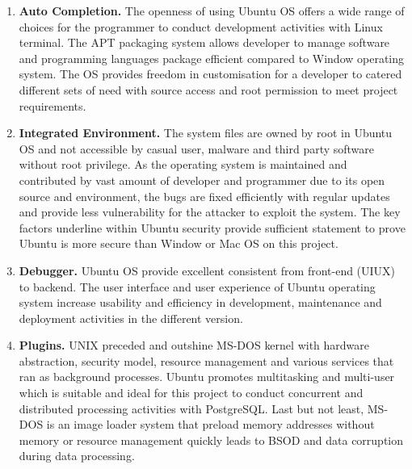 \begin{enumerate}[topsep=0pt,itemsep=-1ex,partopsep=1ex,parsep=1.5ex]
	
	\item \textbf{Auto Completion.} The openness of using Ubuntu OS offers a wide range of choices for the programmer to conduct development activities with Linux terminal. The APT packaging system allows developer to manage software and programming languages package efficient compared to Window operating system. The OS provides freedom in customisation for a developer to catered different sets of need with source access and root permission to meet project requirements.
	\newline
	
	\item \textbf{Integrated Environment. } The system files are owned by root in Ubuntu OS and not accessible by casual user, malware and third party software without root privilege. \cite{ubuntu-secure-than-window} As the operating system is maintained and contributed by vast amount of developer and programmer due to its open source and environment, the bugs are fixed efficiently with regular updates and provide less vulnerability for the attacker to exploit the system. \cite{linux-secure-than-window} The key factors underline within Ubuntu security provide sufficient statement to prove Ubuntu is more secure than Window or Mac OS on this project.	
	\newline
	
	\item \textbf{Debugger. } Ubuntu OS provide excellent consistent from front-end (UIUX) to backend. The user interface and user experience of Ubuntu operating system increase usability and efficiency in development, maintenance and deployment activities in the different version.
	\newline
	
	\item \textbf{Plugins.} UNIX preceded and outshine MS-DOS kernel with hardware abstraction, security model, resource management and various services that ran as background processes. \cite{difference-unix-msdos} Ubuntu promotes multitasking and multi-user which is suitable and ideal for this project to conduct concurrent and distributed processing activities with PostgreSQL. Last but not least, MS-DOS is an image loader system that preload memory addresses without memory or resource management quickly leads to BSOD and data corruption during data processing.
	
	
\end{enumerate}

